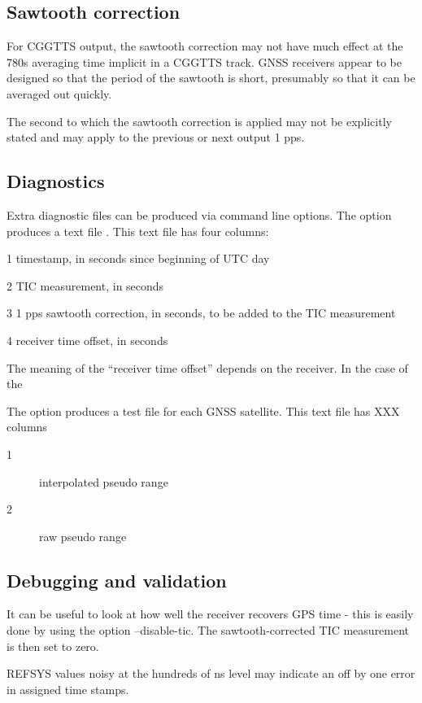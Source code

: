 \subsection{Sawtooth correction}

For CGGTTS output, the sawtooth correction may not have much effect at the 780s averaging
time implicit in a CGGTTS track. GNSS receivers appear to be designed so that the period of the sawtooth is
short, presumably so that it can be averaged out quickly.

The second to which the sawtooth correction is applied may not be explicitly stated and may apply to the previous
or next output 1 pps.

\subsection{Diagnostics}

Extra diagnostic files can be produced via command line options.
The option  produces a text file . This text file has four columns:
	\begin{description*}
	\item[1] timestamp, in seconds since beginning of UTC day
	\item[2] TIC measurement, in seconds
	\item[3] 1 pps sawtooth correction, in seconds, to be added to the TIC measurement
	\item[4] receiver time offset, in seconds
	\end{description*}

The meaning of the ``receiver time offset'' depends on the receiver. In the case of the 

The option  produces a test file  for each GNSS satellite. This text file has
XXX columns
	\begin{description}
	\item[1] interpolated pseudo range
	\item[2] raw pseudo range
	\end{description}
	
\subsection{Debugging and validation}

It can be useful to look at how well the receiver recovers GPS time - this is easily done by
using the option --disable-tic. The sawtooth-corrected TIC measurement is then set to zero.

REFSYS values noisy at the hundreds of ns level may indicate an off by one error in assigned time stamps.

